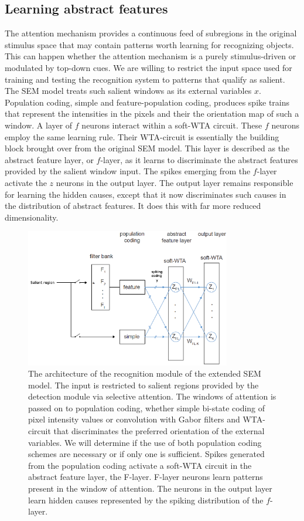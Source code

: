 \documentclass{report}
\begin{document}
\subsection{Learning abstract features}

The attention mechanism provides a continuous feed of subregions in the original stimulus space that may contain patterns worth learning for recognizing objects. This can happen whether the attention mechanism is a purely stimulus-driven or modulated by top-down cues. We are willing to restrict the input space used for training and testing the recognition system to patterns that qualify as salient. The SEM model treats such salient windows as its external variables $x$. Population coding, simple and feature-population coding, produces spike trains that represent the intensities in the pixels and their the orientation map of such a window. A layer of $f$ neurons interact within a soft-WTA circuit. These $f$ neurons employ the same learning rule. Their WTA-circuit is essentially the building block brought over from the original SEM model. This layer is described as the abstract feature layer, or $f$-layer, as it learns to discriminate the abstract features provided by the salient window input. The spikes emerging from the $f$-layer activate the $z$ neurons in the output layer. The output layer remains responsible for learning the hidden causes, except that it now discriminates such causes in the distribution of abstract features. It does this with far more reduced dimensionality.

\begin{figure}[ht]
\centering
\includegraphics[width=0.8\textwidth]{architecture_recognition}
\caption{The architecture of the recognition module of the extended SEM model. The input is restricted to salient regions provided by the detection module via selective attention. The windows of attention is passed on to population coding, whether simple bi-state coding of pixel intensity values or convolution with Gabor filters and WTA-circuit that discriminates the preferred orientation of the external variables. We will determine if the use of both population coding schemes are necessary or if only one is sufficient. Spikes generated from the population coding activate a soft-WTA circuit in the abstract feature layer, the F-layer. F-layer neurons learn patterns present in the window of attention. The neurons in the output layer learn hidden causes represented by the spiking distribution of the $f$-layer. 
\label{fig:architecture_recognition}}
\end{figure}
\end{document}
